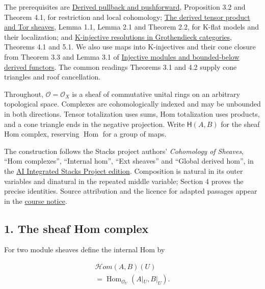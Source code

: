 \documentclass[
  english,
  11pt,
  a4paper,
]{article}
\begin{document}
The prerequisites are
\hyperref[derived-pullback-and-pushforward]{Derived pullback and
pushforward}, Proposition 3.2 and Theorem 4.1, for restriction and local
cohomology; \hyperref[derived-tensor-products-and-tor-sheaves]{The
derived tensor product and Tor sheaves}, Lemma 1.1, Lemma 2.1 and
Theorem 2.2, for K-flat models and their localization; and
\hyperref[k-injective-resolutions-in-grothendieck-categories]{K-injective
resolutions in Grothendieck categories}, Theorems 4.1 and 5.1. We also
use maps into K-injectives and their cone closure from Theorem 3.3 and
Lemma 3.1 of
\hyperref[injective-modules-and-bounded-below-derived-functors]{Injective
modules and bounded-below derived functors}. The common
reading\textquotesingle s Theorems 3.1 and 4.2 supply cone triangles and
roof cancellation.

Throughout, \(\mathcal O=\mathcal O_X\) is a sheaf of commutative unital
rings on an arbitrary topological space. Complexes are cohomologically
indexed and may be unbounded in both directions. Tensor totalization
uses sums, Hom totalization uses products, and a cone triangle ends in
the negative projection. Write \(\mathsf H(A,B)\) for the sheaf Hom
complex, reserving \(\operatorname{Hom}\) for a group of maps.

The construction follows the Stacks project authors' \emph{Cohomology of
Sheaves}, ``Hom complexes'', ``Internal hom'', ``Ext sheaves'' and
``Global derived hom'', in the
\href{https://github.com/KokunoYumeto/unofficial-stacks-project-ai-drafts/blob/565b10e987aba5969b21145a0833f42d69f96790/cohomology.tex}{AI
Integrated Stacks Project edition}. Composition is natural in its outer
variables and dinatural in the repeated middle variable; Section 4
proves the precise identities. Source attribution and the licence for
adapted passages appear in the \hyperref[sources-and-authorship]{course
notice}.

\subsection{1. The sheaf Hom
complex}\label{internal-derived-hom-and-ext-sheaves--1-the-sheaf-hom-complex}

For two module sheaves define the internal Hom by

\[\begin{gathered}
\mathcal Hom(A,B)(U)\\
=\operatorname{Hom}_{\mathcal O_U}(A|_U,B|_U).
\end{gathered}
\tag{1.1}\]
\end{document}
